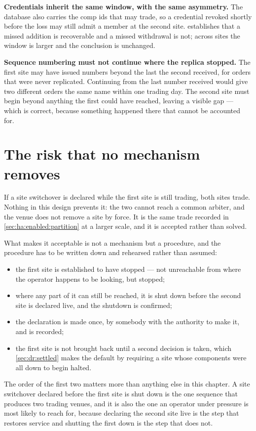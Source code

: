 \textbf{Credentials inherit the same window, with the same asymmetry.} The
database also carries the comp ids that may trade, so a credential revoked
shortly before the loss may still admit a member at the second site.
 establishes that a missed addition is recoverable and
a missed withdrawal is not; across sites the window is larger and the conclusion
is unchanged.

\textbf{Sequence numbering must not continue where the replica stopped.} The
first site may have issued numbers beyond the last the second received, for
orders that were never replicated. Continuing from the last number received would
give two different orders the same name within one trading day. The second site
must begin beyond anything the first could have reached, leaving a visible gap
--- which is correct, because something happened there that cannot be accounted
for.

\section{The risk that no mechanism removes}
\label{sec:dr:residual}

If a site switchover is declared while the first site is still trading, both
sites trade. Nothing in this design prevents it: the two cannot reach a common
arbiter, and the venue does not remove a site by force. It is the same trade
recorded in \cref{sec:ha:enabled:partition} at a larger scale, and it is
accepted rather than solved.

What makes it acceptable is not a mechanism but a procedure, and the procedure
has to be written down and rehearsed rather than assumed:

\begin{itemize}[nosep]
  \item the first site is established to have stopped --- not unreachable from
        where the operator happens to be looking, but stopped;
  \item where any part of it can still be reached, it is shut down before the
        second site is declared live, and the shutdown is confirmed;
  \item the declaration is made once, by somebody with the authority to make it,
        and is recorded;
  \item the first site is not brought back until a second decision is taken,
        which \cref{sec:dr:settled} makes the default by requiring a site whose
        components were all down to begin halted.
\end{itemize}

The order of the first two matters more than anything else in this chapter. A
site switchover declared before the first site is shut down is the one sequence
that produces two trading venues, and it is also the one an operator under
pressure is most likely to reach for, because declaring the second site live is
the step that restores service and shutting the first down is the step that does
not.
